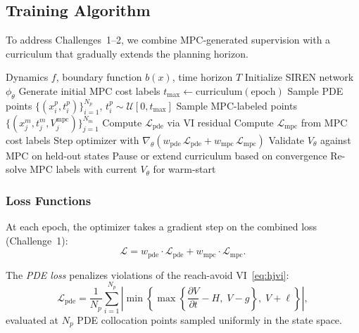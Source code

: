 \documentclass[letterpaper, 10 pt, conference]{ieeeconf}
\begin{document}
\subsection{Training Algorithm}\label{sec:training}

To address Challenges~1--2, we combine MPC-generated supervision with a curriculum that gradually extends the planning horizon.

\begin{algorithm}[t]
\caption{MPC-Supervised Neural BRAT Training}\label{alg:training}
\begin{algorithmic}[1]
\REQUIRE Dynamics $f$, boundary function $b(x)$, time horizon $T$
\STATE Initialize SIREN network $\phi_\theta$
\STATE Generate initial MPC cost labels
  \STATE $t_{\max} \leftarrow \mathrm{curriculum}(\text{epoch})$ 
  \STATE Sample PDE points $\{(x_i^p, t_i^p)\}_{i=1}^{N_p}$, \; $t_i^p \sim \mathcal{U}[0, t_{\max}]$
  \STATE Sample MPC-labeled points $\{(x_j^m, t_j^m, V_j^{\mathrm{mpc}})\}_{j=1}^{N_m}$
  \STATE Compute $\mathcal{L}_{\mathrm{pde}}$ via VI residual 
  \STATE Compute $\mathcal{L}_{\mathrm{mpc}}$ from MPC cost labels 
  \STATE Step optimizer with $\nabla_\theta(w_{\mathrm{pde}}\,\mathcal{L}_{\mathrm{pde}} + w_{\mathrm{mpc}}\,\mathcal{L}_{\mathrm{mpc}})$
    \STATE Validate $V_\theta$ against MPC on held-out states
    \STATE Pause or extend curriculum based on convergence
  \ENDIF
    \STATE Re-solve MPC labels with current $V_\theta$ for warm-start
  \ENDIF
\ENDFOR
\end{algorithmic}
\end{algorithm}

\subsubsection{Loss Functions}\label{sec:losses}

At each epoch, the optimizer takes a gradient step on the combined loss (Challenge~1):
\begin{equation}\label{eq:loss}
\mathcal{L} = w_{\mathrm{pde}} \cdot \mathcal{L}_{\mathrm{pde}} + w_{\mathrm{mpc}} \cdot \mathcal{L}_{\mathrm{mpc}}.
\end{equation}

The \emph{PDE loss} penalizes violations of the reach-avoid VI~\eqref{eq:hjvi}:
\begin{equation}\label{eq:pde_loss}
\mathcal{L}_{\mathrm{pde}} = \frac{1}{N_p}\sum_{i=1}^{N_p} \left| \min\!\left\{\max\!\left\{\frac{\partial V}{\partial t} - H,\; V - g\right\},\; V + \ell\right\}\right|,
\end{equation}
evaluated at $N_p$ PDE collocation points sampled uniformly in the state space.
\end{document}

